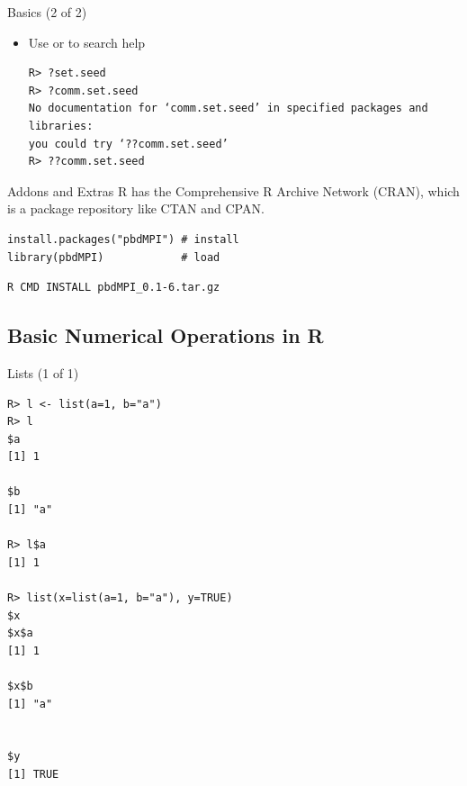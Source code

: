 \begin{frame}[fragile]
  \begin{block}{Basics (2 of 2)}\pause
  \begin{itemize}[<+-|alert@+>]
    \item Use  or  to search help
    \vspace{-.4cm}
    \begin{lstlisting}[backgroundcolor=\color{white},basicstyle=\ttfamily\color{dkgray}\scriptsize,keywordstyle=\color{black}, 
  commentstyle=\color{orange},stringstyle=\color{mauve}]
R> ?set.seed
R> ?comm.set.seed
No documentation for ‘comm.set.seed’ in specified packages and libraries:
you could try ‘??comm.set.seed’
R> ??comm.set.seed
    \end{lstlisting}
  \end{itemize}
\end{block}
\end{frame}


\begin{frame}[fragile]
  \begin{block}{Addons and Extras}\pause
  R has the Comprehensive R Archive Network (CRAN), which is a package repository like CTAN and CPAN.
  \begin{lstlisting}[title=From R]
install.packages("pbdMPI") # install
library(pbdMPI)            # load
\end{lstlisting}

\begin{lstlisting}[title=From 	Shell,backgroundcolor=\color{white},basicstyle=\ttfamily\color{black}\scriptsize,keywordstyle=\color{black}, 
  commentstyle=\color{black},stringstyle=\color{black}]
R CMD INSTALL pbdMPI_0.1-6.tar.gz
\end{lstlisting}
\end{block}
\end{frame}



\subsection{Basic Numerical Operations in R}

\begin{frame}
  \begin{exampleblock}{Lists (1 of 1)}\pause
  \begin{lstlisting}[backgroundcolor=\color{white},basicstyle=\ttfamily\color{dkgray}\scriptsize,keywordstyle=\color{black}, 
  commentstyle=\color{orange},stringstyle=\color{mauve}]
R> l <- list(a=1, b="a")
R> l
$a
[1] 1

$b
[1] "a"

R> l$a
[1] 1

R> list(x=list(a=1, b="a"), y=TRUE)
$x
$x$a
[1] 1

$x$b
[1] "a"


$y
[1] TRUE
\end{lstlisting}
  \end{exampleblock}
\end{frame}



